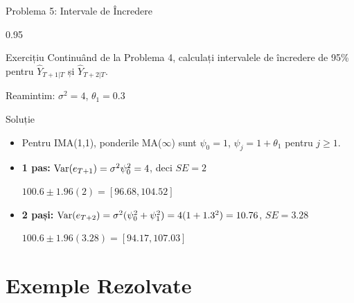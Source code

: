 \documentclass[9pt, aspectratio=169, t]{beamer}
\begin{document}
\begin{frame}{Problema 5: Intervale de Încredere}
    \begin{cminipage}{0.95\textwidth}
    \begin{block}{Exercițiu}
        Continuând de la Problema 4, calculați intervalele de încredere de 95\% pentru $\hat{Y}_{T+1|T}$ și $\hat{Y}_{T+2|T}$.

        Reamintim: $\sigma^2 = 4$, $\theta_1 = 0.3$
    \end{block}

    \vspace{0.3cm}
    \pause
    \begin{exampleblock}{Soluție}
        \begin{itemize}\setlength{\itemsep}{0pt}
        \item Pentru IMA(1,1), ponderile MA($\infty$) sunt $\psi_0 = 1$, $\psi_j = 1 + \theta_1$ pentru $j \geq 1$.
        \item \textbf{1 pas:} $\text{Var}(e_{T+1}) = \sigma^2 \psi_0^2 = 4$, deci $SE = 2$

        $100.6 \pm 1.96(2) = \mathbf{[96.68, 104.52]}$
        \item \textbf{2 pași:} $\text{Var}(e_{T+2}) = \sigma^2(\psi_0^2 + \psi_1^2) = 4(1 + 1.3^2) = 10.76$, $SE = 3.28$

        $100.6 \pm 1.96(3.28) = \mathbf{[94.17, 107.03]}$
        \end{itemize}
    \end{exampleblock}
    \end{cminipage}
\end{frame}

\section{Exemple Rezolvate}
\end{document}
